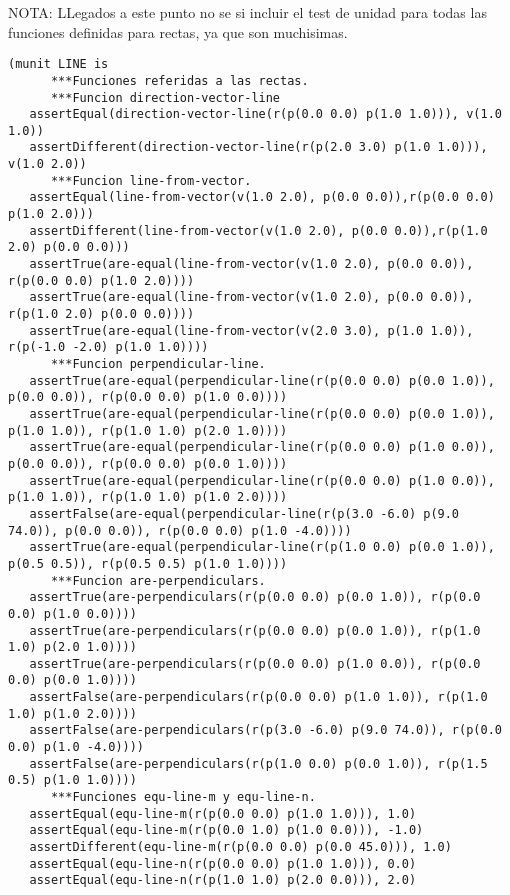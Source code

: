 NOTA: LLegados a este punto no se si incluir el test de unidad para todas las funciones definidas para rectas, ya que son muchisimas. \par

{\codesize
\begin{verbatim}
(munit LINE is
      ***Funciones referidas a las rectas.
      ***Funcion direction-vector-line
   assertEqual(direction-vector-line(r(p(0.0 0.0) p(1.0 1.0))), v(1.0 1.0))	
   assertDifferent(direction-vector-line(r(p(2.0 3.0) p(1.0 1.0))), v(1.0 2.0))
      ***Funcion line-from-vector.
   assertEqual(line-from-vector(v(1.0 2.0), p(0.0 0.0)),r(p(0.0 0.0) p(1.0 2.0)))
   assertDifferent(line-from-vector(v(1.0 2.0), p(0.0 0.0)),r(p(1.0 2.0) p(0.0 0.0)))
   assertTrue(are-equal(line-from-vector(v(1.0 2.0), p(0.0 0.0)), r(p(0.0 0.0) p(1.0 2.0))))
   assertTrue(are-equal(line-from-vector(v(1.0 2.0), p(0.0 0.0)), r(p(1.0 2.0) p(0.0 0.0))))
   assertTrue(are-equal(line-from-vector(v(2.0 3.0), p(1.0 1.0)), r(p(-1.0 -2.0) p(1.0 1.0))))
      ***Funcion perpendicular-line.
   assertTrue(are-equal(perpendicular-line(r(p(0.0 0.0) p(0.0 1.0)), p(0.0 0.0)), r(p(0.0 0.0) p(1.0 0.0))))
   assertTrue(are-equal(perpendicular-line(r(p(0.0 0.0) p(0.0 1.0)), p(1.0 1.0)), r(p(1.0 1.0) p(2.0 1.0))))
   assertTrue(are-equal(perpendicular-line(r(p(0.0 0.0) p(1.0 0.0)), p(0.0 0.0)), r(p(0.0 0.0) p(0.0 1.0))))
   assertTrue(are-equal(perpendicular-line(r(p(0.0 0.0) p(1.0 0.0)), p(1.0 1.0)), r(p(1.0 1.0) p(1.0 2.0))))
   assertFalse(are-equal(perpendicular-line(r(p(3.0 -6.0) p(9.0 74.0)), p(0.0 0.0)), r(p(0.0 0.0) p(1.0 -4.0))))
   assertTrue(are-equal(perpendicular-line(r(p(1.0 0.0) p(0.0 1.0)), p(0.5 0.5)), r(p(0.5 0.5) p(1.0 1.0))))
      ***Funcion are-perpendiculars.
   assertTrue(are-perpendiculars(r(p(0.0 0.0) p(0.0 1.0)), r(p(0.0 0.0) p(1.0 0.0))))
   assertTrue(are-perpendiculars(r(p(0.0 0.0) p(0.0 1.0)), r(p(1.0 1.0) p(2.0 1.0))))
   assertTrue(are-perpendiculars(r(p(0.0 0.0) p(1.0 0.0)), r(p(0.0 0.0) p(0.0 1.0))))
   assertFalse(are-perpendiculars(r(p(0.0 0.0) p(1.0 1.0)), r(p(1.0 1.0) p(1.0 2.0))))
   assertFalse(are-perpendiculars(r(p(3.0 -6.0) p(9.0 74.0)), r(p(0.0 0.0) p(1.0 -4.0))))
   assertFalse(are-perpendiculars(r(p(1.0 0.0) p(0.0 1.0)), r(p(1.5 0.5) p(1.0 1.0))))
      ***Funciones equ-line-m y equ-line-n.
   assertEqual(equ-line-m(r(p(0.0 0.0) p(1.0 1.0))), 1.0)
   assertEqual(equ-line-m(r(p(0.0 1.0) p(1.0 0.0))), -1.0)
   assertDifferent(equ-line-m(r(p(0.0 0.0) p(0.0 45.0))), 1.0)
   assertEqual(equ-line-n(r(p(0.0 0.0) p(1.0 1.0))), 0.0)
   assertEqual(equ-line-n(r(p(1.0 1.0) p(2.0 0.0))), 2.0)

\end{verbatim}}
